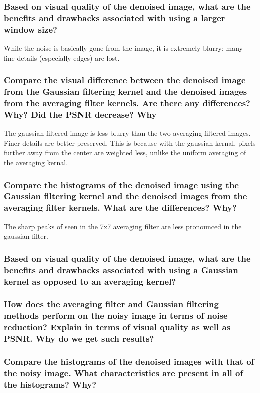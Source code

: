 \documentclass[article, 1.5space, letterpaper, 12pt, oneside, header, footer]{SydeClass}
\begin{document}
\subsubsection{Based on visual quality of the denoised image, what are the benefits and drawbacks associated with
using a larger window size?}
While the noise is basically gone from the image, it is extremely blurry; many fine details (especially edges) are lost.


\subsubsection{Compare the visual difference between the denoised image from the Gaussian filtering kernel and the
denoised images from the averaging filter kernels. Are there any differences? Why? Did the PSNR
decrease? Why}
The gaussian filtered image is less blurry than the two averaging filtered images. Finer details are better preserved. This is because with the gaussian kernal, pixels further away from the center are weighted less, unlike the uniform averaging of the averaging kernal.


\subsubsection{Compare the histograms of the denoised image using the Gaussian filtering kernel and the denoised
images from the averaging filter kernels. What are the differences? Why?}
The sharp peaks of seen in the 7x7 averaging filter are less pronounced in the gaussian filter. 


\subsubsection{Based on visual quality of the denoised image, what are the benefits and drawbacks associated with
using a Gaussian kernel as opposed to an averaging kernel?}


\subsubsection{How does the averaging filter and Gaussian filtering methods perform on the noisy image in terms of
noise reduction? Explain in terms of visual quality as well as PSNR. Why do we get such results?}


\subsubsection{Compare the histograms of the denoised images with that of the noisy image. What characteristics
are present in all of the histograms? Why?}
\end{document}
